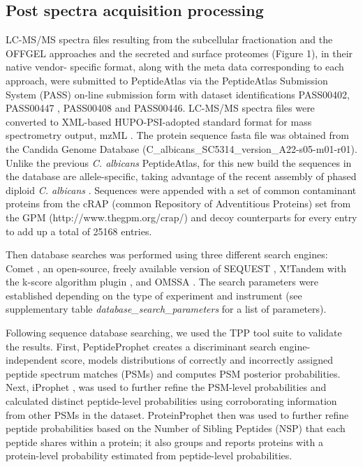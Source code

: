 \subsection*{Post spectra acquisition processing}

LC-MS/MS spectra files resulting from the subcellular fractionation and the OFFGEL
approaches and the secreted and surface proteomes (Figure 1), in their native vendor-
specific format, along with the meta data corresponding to each approach, were submitted to
PeptideAtlas via the PeptideAtlas Submission System (PASS) on-line submission form with
dataset identifications PASS00402, PASS00447 , PASS00408 and PASS00446. LC-MS/MS
spectra files were converted to XML-based HUPO-PSI-adopted standard format for mass
spectrometry output, mzML \citep{Martens2011}. The protein sequence fasta file was obtained from the
Candida Genome Database  (C\_albicans\_SC5314\_version\_A22-s05-m01-r01). Unlike the
previous \textit{C. albicans} PeptideAtlas, for this new build the sequences in the database are
allele-specific, taking advantage of the recent assembly of phased diploid \textit{C. albicans} \citep{Muzzey2013}.
Sequences were appended with a set of common contaminant proteins from the cRAP
(common Repository of Adventitious Proteins) set from the GPM \linebreak (http://www.thegpm.org/crap/) 
and decoy counterparts for every entry to add up a total of 25168 entries.

Then database searches was performed using three different search engines: Comet \citep{Eng2013},
an open-source, freely available version of SEQUEST \citep{Eng1994}, X!Tandem \citep{Craig2004} with the k-score
algorithm plugin \citep{MacLean2006}, and OMSSA \citep{Geer2004}. The search parameters were established depending
on the type of experiment and instrument (see supplementary table \textit{database\_search\_parameters} for a list of parameters).

Following sequence database searching, we used the TPP tool suite to validate the results.
First, PeptideProphet \citep{Keller2002} creates a discriminant search engine-independent score, models
distributions of correctly and incorrectly assigned peptide spectrum matches (PSMs) and
computes PSM posterior probabilities. Next, iProphet \citep{Shteynberg2011}, was used to further refine the
PSM-level probabilities and calculated distinct peptide-level probabilities using corroborating
information from other PSMs in the dataset. ProteinProphet \citep{Nesvizhskii2003} then was used to further
refine peptide probabilities based on the Number of Sibling Peptides (NSP) that each peptide
shares within a protein; it also groups and reports proteins with a protein-level probability
estimated from peptide-level probabilities.

